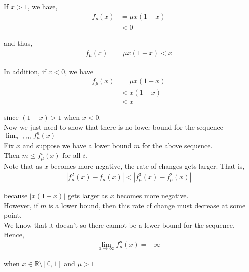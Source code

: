 \documentclass[12pt]{article}
\begin{document}
\begin{enumerate}[label=(\alph*)]
If $x > 1$, we have,
\begin{align*}
f_{\mu}(x) &= \mu x(1-x)\\
&< 0
\end{align*}

and thus,
\begin{align*}
f_{\mu}(x) &= \mu x(1-x) < x
\end{align*}

In addition, if $x < 0$, we have
\begin{align*}
f_{\mu}(x) &= \mu x(1-x)\\
&< x(1-x)\\
&< x
\end{align*}

since $(1-x) > 1$ when $x < 0$.\\

Now we just need to show that there is no lower bound for the sequence $\lim_{n \to \infty} f^n_{\mu}(x)$\\

Fix $x$ and suppose we have a lower bound $m$ for the above sequence.\\

Then $m \leq f^i_{\mu} (x)$ for all $i$.\\

Note that as $x$ becomes more negative, the rate of changes gets larger. That is,
\begin{align*}
|f_{\mu}^2(x) - f_{\mu}(x)| < |f_{\mu}^3(x) - f_{\mu}^2(x)|
\end{align*}

because $|x(1-x)|$ gets larger as $x$ becomes more negative.\\

However, if $m$ is a lower bound, then this rate of change must decrease at some point.\\

We know that it doesn't so there cannot be a lower bound for the sequence. Hence,
\begin{align*}
\lim_{n \to \infty} f^n_{\mu}(x) = -\infty
\end{align*}

when $x \in \mathbb{R} \setminus [0,1]$ and $\mu > 1$

\end{enumerate}
\end{document}
